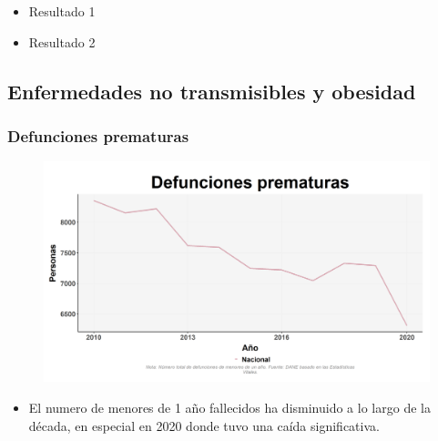     
    \begin{tcolorbox}[enhanced, colback=mycolor,colframe=mycolor,drop fuzzy shadow,watermark color=white,
                        title=Principales Resultados]
    
            \begin{itemize}
                    \item Resultado 1 
                    \item Resultado 2
            \end{itemize}
     
    \end{tcolorbox}
    
    
    \subsection{Enfermedades no transmisibles y obesidad}
        \subsubsection{Defunciones prematuras}

    \begin{figure}[H]
        \caption[Defunciones prematuras a nivel nacional ]{\label{defprem_nal_trend} }
        \begin{center}
        \includegraphics[width=\textwidth,keepaspectratio]{img/var_281_trend.png}
        \end{center}
    \end{figure}
            \begin{itemize}
                \item El numero de menores de 1 año fallecidos ha disminuido a lo largo de la década, en especial en 2020 donde tuvo una caída significativa.
                \end{itemize}


